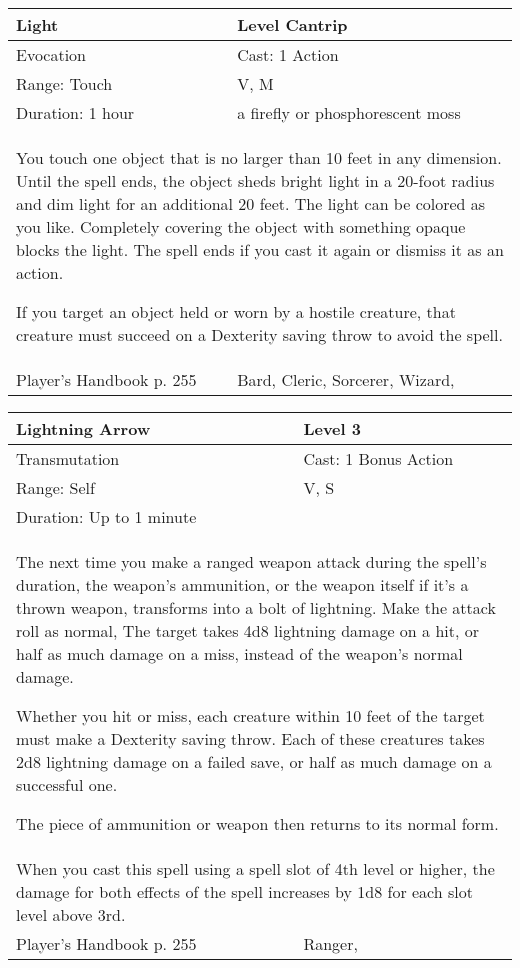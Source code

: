 \documentclass[11pt]{report}
\begin{document}
\begin{table}[H]
	\begin{tabular}{||p{6cm}|p{6cm}||}
		\hline\hline
		\bf{Light} & Level Cantrip\\ \hline
		Evocation & Cast: 1 Action\\ \hline
		Range: Touch & V, M\\ \hline
		Duration: 1 hour & a firefly or phosphorescent moss\\ \hline
		\multicolumn{2}{||p{12cm}||}{You touch one object that is no larger than 10 feet in any dimension. Until the spell ends, the object sheds bright light in a 20-foot radius and dim light for an additional 20 feet. The light can be colored as you like. Completely covering the object with something opaque blocks the light. The spell ends if you cast it again or dismiss it as an action.

If you target an object held or worn by a hostile creature, that creature must succeed on a Dexterity saving throw to avoid the spell.}\\ \hline
Player's Handbook p. 255 & Bard, Cleric, Sorcerer, Wizard, \\ \hline\hline
	\end{tabular}
\end{table}

\begin{table}[H]
	\begin{tabular}{||p{6cm}|p{6cm}||}
		\hline\hline
		\bf{Lightning Arrow} & Level 3\\ \hline
		Transmutation & Cast: 1 Bonus Action\\ \hline
		Range: Self & V, S\\ \hline
		Duration: Up to 1 minute & \\ \hline
		\multicolumn{2}{||p{12cm}||}{The next time you make a ranged weapon attack during the spell’s duration, the weapon’s ammunition, or the weapon itself if it’s a thrown weapon, transforms into a bolt of lightning. Make the attack roll as normal, The target takes 4d8 lightning damage on a hit, or half as much damage on a miss, instead of the weapon’s normal damage.

Whether you hit or miss, each creature within 10 feet of the target must make a Dexterity saving throw. Each of these creatures takes 2d8 lightning damage on a failed save, or half as much damage on a successful one.

The piece of ammunition or weapon then returns to its normal form.}\\ \hline
		\multicolumn{2}{||p{12cm}||}{When you cast this spell using a spell slot of 4th level or higher, the damage for both effects of the spell increases by 1d8 for each slot level above 3rd.}\\ \hline
Player's Handbook p. 255 & Ranger, \\ \hline\hline
	\end{tabular}
\end{table}
\end{document}
